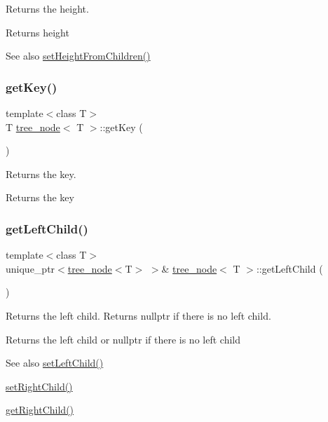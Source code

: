Returns the height. \begin{DoxyReturn}{Returns}
height 
\end{DoxyReturn}
\begin{DoxySeeAlso}{See also}
\hyperlink{classtree__node_ab83ce531535bd54bdee8fd3ee9e4c128}{set\+Height\+From\+Children()} 
\end{DoxySeeAlso}
\mbox{\label{classtree__node_afbe2d91ad009570338290ed9eb8a7485}} 
\subsubsection{\texorpdfstring{get\+Key()}{getKey()}}
{\footnotesize\ttfamily template$<$class T$>$ \\
T \hyperlink{classtree__node}{tree\+\_\+node}$<$ T $>$\+::get\+Key (\begin{DoxyParamCaption}{ }\end{DoxyParamCaption})\hspace{0.3cm}{\ttfamily [inline]}}

Returns the key. \begin{DoxyReturn}{Returns}
the key 
\end{DoxyReturn}
\mbox{\label{classtree__node_ae161b70a3780e0cb3ecd4b57acc9e2d1}} 
\subsubsection{\texorpdfstring{get\+Left\+Child()}{getLeftChild()}}
{\footnotesize\ttfamily template$<$class T$>$ \\
unique\+\_\+ptr$<$\hyperlink{classtree__node}{tree\+\_\+node}$<$T$>$ $>$\& \hyperlink{classtree__node}{tree\+\_\+node}$<$ T $>$\+::get\+Left\+Child (\begin{DoxyParamCaption}{ }\end{DoxyParamCaption})\hspace{0.3cm}{\ttfamily [inline]}}

Returns the left child. Returns nullptr if there is no left child. \begin{DoxyReturn}{Returns}
the left child or nullptr if there is no left child 
\end{DoxyReturn}
\begin{DoxySeeAlso}{See also}
\hyperlink{classtree__node_a3db979969a0fe8505ba65c7afabb5463}{set\+Left\+Child()} 

\hyperlink{classtree__node_afea4c6595dafba65b5c4e59ca3da30f3}{set\+Right\+Child()} 

\hyperlink{classtree__node_a5e584d47f2c11941fe0406836fe50159}{get\+Right\+Child()} 
\end{DoxySeeAlso}
\mbox{\label{classtree__node_a70bdade8011a6a46b083ea680fcea52f}} 
